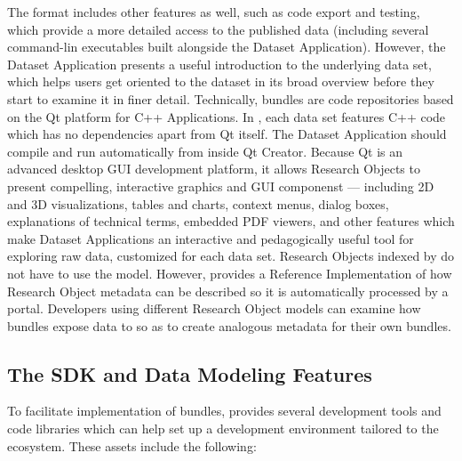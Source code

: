 \documentclass[11pt,letterpaper]{article}
\begin{document}
\p{}
The {\RAK} format includes other 
features as well, such as code export and testing, 
which provide a more detailed access to 
the published data (including several command-lin 
executables built alongside the Dataset Application).  
However, the Dataset Application 
presents a useful introduction to the underlying 
data set, which helps users get oriented to the dataset 
in its broad overview before they start to examine it in 
finer detail.
\p{}
Technically, {\MOSAIC} {\RAK} bundles are code repositories 
based on the Qt platform for C++ Applications.  
In {\RAK}, each data set features C++ code which has no 
dependencies apart from Qt itself.  The Dataset 
Application should compile and run automatically from 
inside Qt Creator.  Because Qt is an advanced 
desktop GUI development platform, it allows 
Research Objects to present compelling, 
interactive graphics and GUI componenst 
--- including 2D and 3D visualizations, tables and charts, 
context menus, dialog boxes, explanations of 
technical terms, embedded PDF viewers, and other 
features which make Dataset Applications an 
interactive and pedagogically useful tool for 
exploring raw data, customized for each data set.
\p{}  
Research Objects indexed by {\MOSAIC} do not have to 
use the {\RAK} model.  However, {\RAK} provides a 
Reference Implementation of how Research Object 
metadata can be described so it is automatically 
processed by a {\MOSAIC} portal.  Developers 
using different Research Object models can 
examine how {\RAK} bundles expose data to {\MOSAIC} 
so as to create analogous metadata for their own 
bundles.
\p{}
\subsection{The {\lMOSAIC} SDK and Data Modeling Features}
To facilitate implementation of {\RAK} bundles, 
{\MOSAIC} provides several development tools and 
code libraries which can help set up a development 
environment tailored to the {\MOSAIC} ecosystem.  
These assets include the following: 
\end{document}
